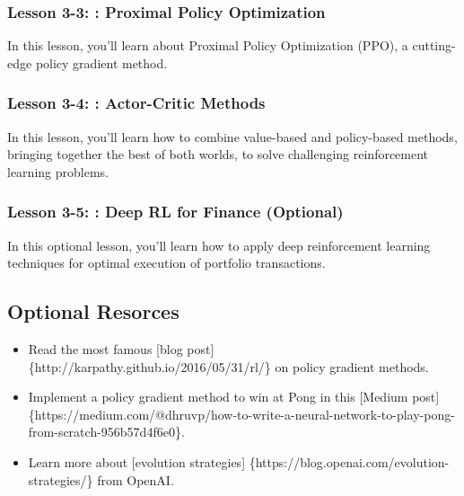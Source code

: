 \documentclass[11pt]{article}
\providecommand{\tightlist}{%
      \setlength{\itemsep}{0pt}\setlength{\parskip}{0pt}}
\begin{document}
\hypertarget{lesson-3-3-proximal-policy-optimization}{%
\subsubsection{Lesson 3-3: : Proximal Policy
Optimization}\label{lesson-3-3-proximal-policy-optimization}}

In this lesson, you'll learn about Proximal Policy Optimization (PPO), a
cutting-edge policy gradient method.

\hypertarget{lesson-3-4-actor-critic-methods}{%
\subsubsection{Lesson 3-4: : Actor-Critic
Methods}\label{lesson-3-4-actor-critic-methods}}

In this lesson, you'll learn how to combine value-based and policy-based
methods, bringing together the best of both worlds, to solve challenging
reinforcement learning problems.

\hypertarget{lesson-3-5-deep-rl-for-finance-optional}{%
\subsubsection{Lesson 3-5: : Deep RL for Finance
(Optional)}\label{lesson-3-5-deep-rl-for-finance-optional}}

In this optional lesson, you'll learn how to apply deep reinforcement
learning techniques for optimal execution of portfolio transactions.

    \hypertarget{optional-resorces}{%
\subsection{Optional Resorces}\label{optional-resorces}}

\begin{itemize}
\tightlist
\item
  Read the most famous {[}blog post{]}
  \{http://karpathy.github.io/2016/05/31/rl/\} on policy gradient
  methods.
\item
  Implement a policy gradient method to win at Pong in this {[}Medium
  post{]}
  \{https://medium.com/@dhruvp/how-to-write-a-neural-network-to-play-pong-from-scratch-956b57d4f6e0\}.
\item
  Learn more about {[}evolution strategies{]}
  \{https://blog.openai.com/evolution-strategies/\} from OpenAI.
\end{itemize}
\end{document}
